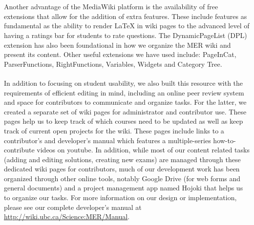 \documentclass{primus}
\begin{document}
\\\\  
\noindent{}Another advantage of the MediaWiki platform is the availability of free extensions that allow for the addition of extra features.  These include features as fundamental as the ability to render LaTeX in wiki pages to the advanced level of having a ratings bar for students to rate questions.  The DynamicPageList (DPL) extension has also been foundational in how we organize the MER wiki and present its content.  Other useful extensions we have used include: PageInCat, ParserFunctions, RightFunctions, Variables, Widgets and Category Tree.
\\\\  
\noindent{}In addition to focusing on student usability, we also built this resource with the requirements of efficient editing in mind, including an online peer review system and space for contributors to communicate and organize tasks.  For the latter, we created a separate set of wiki pages for administrator and contributor use.  These pages help us to keep track of which courses need to be updated as well as keep track of current open projects for the wiki. These pages include links to a contributor’s and developer’s manual which features a multiple-series how-to-contribute videos on youtube.  In addition, while most of our content related tasks (adding and editing solutions, creating new exams) are managed through these dedicated wiki pages for contributors, much of our development work has been organized through other online tools, notably Google Drive (for web forms and general documents) and a project management app named Hojoki that helps us to organize our tasks.  For more information on our design or implementation, please see our complete developer’s manual at \url{http://wiki.ubc.ca/Science:MER/Manual}.
\end{document}
